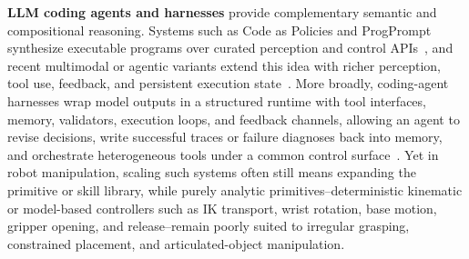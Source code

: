 \documentclass[11pt]{article}
\begin{document}
    \textbf{LLM coding agents and harnesses} provide complementary semantic and compositional reasoning. Systems such as Code as Policies and ProgPrompt synthesize executable programs over curated perception and control APIs~\citep{liang2023code, singh2023progprompt}, and recent multimodal or agentic variants extend this idea with richer perception, tool use, feedback, and persistent execution state~\citep{gupta2023visprog, shi2025maestro, fu2026cap, zhang2026playful}. More broadly, coding-agent harnesses wrap model outputs in a structured runtime with tool interfaces, memory, validators, execution loops, and feedback channels, allowing an agent to revise decisions, write successful traces or failure diagnoses back into memory, and orchestrate heterogeneous tools under a common control surface~\citep{wang2024codeact, yang2024sweagent, wang2025openhands, ning2026code}. Yet in robot manipulation, scaling such systems often still means expanding the primitive or skill library, while purely analytic primitives--deterministic kinematic or model-based controllers such as IK transport, wrist rotation, base motion, gripper opening, and release--remain poorly suited to irregular grasping, constrained placement, and articulated-object manipulation.
\end{document}
